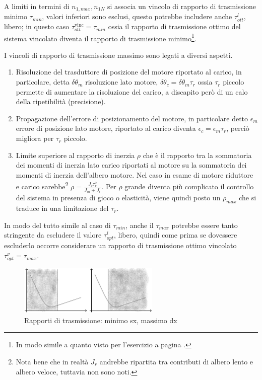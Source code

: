 A limiti in termini di \(n_{1,max},n_{1N}\) si associa un vincolo di rapporto di trasmissione minimo \(\tau_{min}\), valori inferiori sono esclusi, questo potrebbe includere anche \(\tau_{ott}^l\), libero; in questo caso \(\tau^\text{vinc}_{ott} = \tau_{min}\) ossia il rapporto di trasmissione ottimo del sistema vincolato diventa il rapporto di trasmissione minimo\footnote{In modo simile a quanto visto per l'esercizio a pagina \pageref{EsercizioDimRid}.}.

I vincoli di rapporto di trasmissione massimo sono legati a diversi aspetti.

\begin{enumerate}
    \item Risoluzione del trasduttore di posizione del motore riportato al carico, in particolare, detta \(\delta \theta_m\) risoluzione lato motore, \(\delta \theta_c = \delta \theta_m \tau_r\) ossia \(\tau_r\) piccolo permette di aumentare la risoluzione del carico, a discapito però di un calo della ripetibilità (precisione).
    \item Propagazione dell'errore di posizionamento del motore, in particolare detto \(\epsilon_m\) errore di posizione lato motore, riportato al carico diventa \(\epsilon_c=\epsilon_m \tau_r\), perciò migliora per \(\tau_r\) piccolo.
    \item Limite superiore al rapporto di inerzia \(\rho \) che è il rapporto tra la sommatoria dei momenti di inerzia lato carico riportati al motore su la sommatoria dei momenti di inerzia dell'albero motore. Nel caso in esame di motore riduttore e carico sarebbe\footnote{Nota bene che in realtà \(J_r\) andrebbe ripartita tra contributi di albero lento e albero veloce, tuttavia non sono noti.} \(\rho=\frac{J_c \tau_r^2}{J_m+J_r}\).
    Per \(\rho\) grande diventa più complicato il controllo del sistema in presenza di gioco o elasticità, viene quindi posto un \(\rho_{max}\) che si traduce in una limitazione del \(\tau_r\).
\end{enumerate}

In modo del tutto simile al caso di \(\tau_{min}\), anche il \(\tau_{max}\) potrebbe essere tanto stringente da escludere il valore \(\tau_{opt}^l\), libero, quindi  come prima se dovessere escluderlo occorre considerare un rapporto di trasmissione ottimo vincolato \(\tau_{opt}^v=\tau_{max}\).

\begin{figure}[h]
    \centering
    \includegraphics[width=0.6\textwidth]{Immagini/tauRmax_tauRmin.png}
    \caption{Rapporti di trasmissione: minimo sx, massimo dx}
\end{figure}


